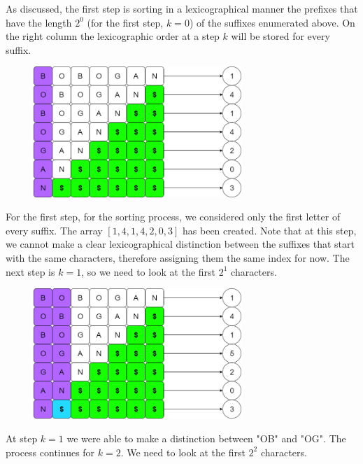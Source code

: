 \documentclass[letterpaper]{article}
\begin{document}
\newpage

As discussed, the first step is sorting in a lexicographical manner the prefixes that have the length $2^0$ (for the first step, $k = 0$) of the suffixes enumerated above. On the right column the lexicographic order at a step $k$ will be stored for every suffix.

\begin{figure} [h!]
\centering
\includegraphics[width=0.7\textwidth]{pngOfDiagrams/suffixarrayex2.png}
\end{figure}

For the first step, for the sorting process, we considered only the first letter of every suffix. The array $[1,4,1,4,2,0,3]$ has been created. Note that at this step, we cannot make a clear lexicographical distinction between the suffixes that start with the same characters, therefore assigning them the same index for now. The next step is $k = 1$, so we need to look at the first $2^1$ characters.

\begin{figure} [h!]
\centering
\includegraphics[width=0.7\textwidth]{pngOfDiagrams/suffixarrayex3.png}
\end{figure}

At step $k = 1$ we were able to make a distinction between "OB" and "OG". The process continues for $k = 2$. We need to look at the first $2^2$ characters.
\end{document}
